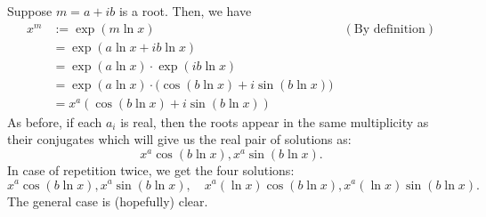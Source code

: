 \begin{mdframed}[style=boxstyle, frametitle={Getting real}]
	Suppose $m = a+ib$ is a root. Then, we have
	\begin{align*} 
		x^m &:= \exp(m \ln x) & (\text{By definition})\\
		&= \exp(a \ln x + ib\ln x)\\
		&= \exp(a \ln x)\cdot\exp(ib \ln x)\\
		&= \exp(a \ln x)\cdot\big(\cos(b\ln x) + i\sin(b \ln x)\big)\\
		&=x^a(\cos(b\ln x) + i\sin(b \ln x))
	\end{align*}
	As before, if each $a_i$ is real, then the roots appear in the same multiplicity as their conjugates which will give us the real pair of solutions as:
	\begin{equation*} 
		x^a\cos(b\ln x), x^a\sin(b\ln x).
	\end{equation*}
	In case of repetition twice, we get the four solutions:
	\begin{equation*} 
		x^a\cos(b\ln x), x^a\sin(b\ln x),\quad x^a(\ln x)\cos(b\ln x), x^a(\ln x)\sin(b\ln x).
	\end{equation*}
	The general case is (hopefully) clear.
\end{mdframed}

